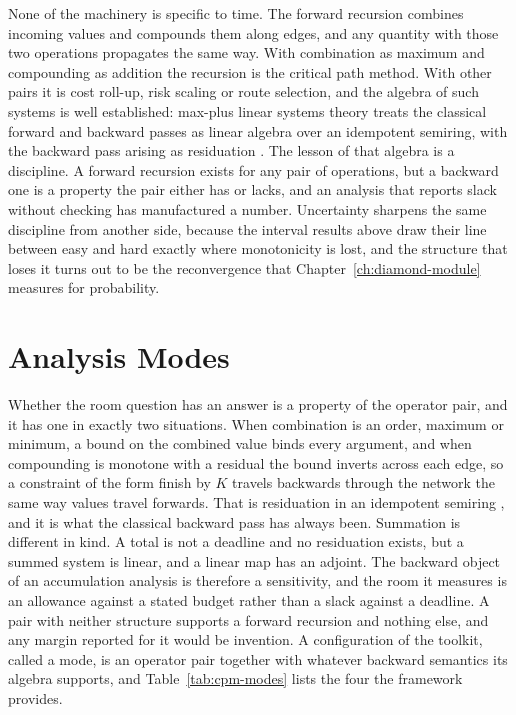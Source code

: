 \documentclass[12pt]{report}
\begin{document}
None of the machinery is specific to time. The forward recursion combines
incoming values and compounds them along edges, and any quantity with those
two operations propagates the same way. With combination as maximum and
compounding as addition the recursion is the critical path method. With other
pairs it is cost roll-up, risk scaling or route selection, and the algebra of
such systems is well established: max-plus linear systems theory treats the
classical forward and backward passes as linear algebra over an idempotent
semiring, with the backward pass arising as residuation
\cite{baccelli1992sync}. The lesson of that algebra is a discipline. A
forward recursion exists for any pair of operations, but a backward one is a
property the pair either has or lacks, and an analysis that reports slack
without checking has manufactured a number. Uncertainty sharpens the same
discipline from another side, because the interval results above draw their
line between easy and hard exactly where monotonicity is lost, and the
structure that loses it turns out to be the reconvergence that
Chapter~\ref{ch:diamond-module} measures for probability.

\section{Analysis Modes}
\label{sec:cpm-modes}

Whether the room question has an answer is a property of the operator pair,
and it has one in exactly two situations. When combination is an order,
maximum or minimum, a bound on the combined value binds every argument, and
when compounding is monotone with a residual the bound inverts across each
edge, so a constraint of the form finish by $K$ travels backwards through
the network the same way values travel forwards. That is residuation in an
idempotent semiring \cite{baccelli1992sync}, and it is what the classical
backward pass has always been. Summation is different in kind. A total is
not a deadline and no residuation exists, but a summed system is linear,
and a linear map has an adjoint. The backward object of an accumulation
analysis is therefore a sensitivity, and the room it measures is an
allowance against a stated budget rather than a slack against a deadline.
A pair with neither structure supports a forward recursion and nothing
else, and any margin reported for it would be invention. A configuration of
the toolkit, called a mode, is an operator pair together with whatever
backward semantics its algebra supports, and Table~\ref{tab:cpm-modes}
lists the four the framework provides.
\end{document}
